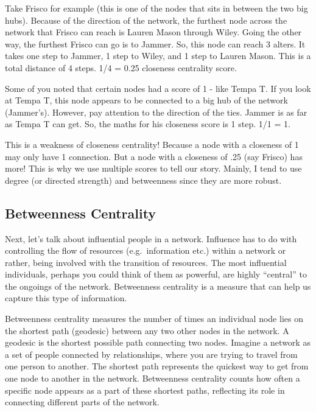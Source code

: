 \documentclass[
  letterpaper,
  DIV=11,
  numbers=noendperiod]{scrreprt}
\begin{document}
Take Frisco for example (this is one of the nodes that sits in between
the two big hubs). Because of the direction of the network, the furthest
node across the network that Frisco can reach is Lauren Mason through
Wiley. Going the other way, the furthest Frisco can go is to Jammer. So,
this node can reach 3 alters. It takes one step to Jammer, 1 step to
Wiley, and 1 step to Lauren Mason. This is a total distance of 4 steps.
1/4 = 0.25 closeness centrality score.

Some of you noted that certain nodes had a score of 1 - like Tempa T. If
you look at Tempa T, this node appears to be connected to a big hub of
the network (Jammer's). However, pay attention to the direction of the
ties. Jammer is as far as Tempa T can get. So, the maths for his
closeness score is 1 step. 1/1 = 1.

This is a weakness of closeness centrality! Because a node with a
closeness of 1 may only have 1 connection. But a node with a closeness
of .25 (say Frisco) has more! This is why we use multiple scores to tell
our story. Mainly, I tend to use degree (or directed strength) and
betweenness since they are more robust.

\subsection{Betweenness Centrality}\label{betweenness-centrality-1}

Next, let's talk about influential people in a network. Influence has to
do with controlling the flow of resources (e.g.~information etc.) within
a network or rather, being involved with the transition of resources.
The most influential individuals, perhaps you could think of them as
powerful, are highly ``central'' to the ongoings of the network.
Betweenness centrality is a measure that can help us capture this type
of information.

Betweenness centrality measures the number of times an individual node
lies on the shortest path (geodesic) between any two other nodes in the
network. A geodesic is the shortest possible path connecting two nodes.
Imagine a network as a set of people connected by relationships, where
you are trying to travel from one person to another. The shortest path
represents the quickest way to get from one node to another in the
network. Betweenness centrality counts how often a specific node appears
as a part of these shortest paths, reflecting its role in connecting
different parts of the network.
\end{document}
